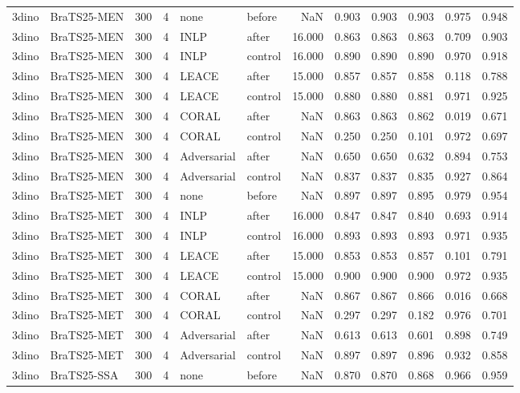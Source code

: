 \begin{tabular}{llrrllrrrrrr}
3dino & BraTS25-MEN & 300 & 4 & none & before & NaN & 0.903 & 0.903 & 0.903 & 0.975 & 0.948 \\
3dino & BraTS25-MEN & 300 & 4 & INLP & after & 16.000 & 0.863 & 0.863 & 0.863 & 0.709 & 0.903 \\
3dino & BraTS25-MEN & 300 & 4 & INLP & control & 16.000 & 0.890 & 0.890 & 0.890 & 0.970 & 0.918 \\
3dino & BraTS25-MEN & 300 & 4 & LEACE & after & 15.000 & 0.857 & 0.857 & 0.858 & 0.118 & 0.788 \\
3dino & BraTS25-MEN & 300 & 4 & LEACE & control & 15.000 & 0.880 & 0.880 & 0.881 & 0.971 & 0.925 \\
3dino & BraTS25-MEN & 300 & 4 & CORAL & after & NaN & 0.863 & 0.863 & 0.862 & 0.019 & 0.671 \\
3dino & BraTS25-MEN & 300 & 4 & CORAL & control & NaN & 0.250 & 0.250 & 0.101 & 0.972 & 0.697 \\
3dino & BraTS25-MEN & 300 & 4 & Adversarial & after & NaN & 0.650 & 0.650 & 0.632 & 0.894 & 0.753 \\
3dino & BraTS25-MEN & 300 & 4 & Adversarial & control & NaN & 0.837 & 0.837 & 0.835 & 0.927 & 0.864 \\
3dino & BraTS25-MET & 300 & 4 & none & before & NaN & 0.897 & 0.897 & 0.895 & 0.979 & 0.954 \\
3dino & BraTS25-MET & 300 & 4 & INLP & after & 16.000 & 0.847 & 0.847 & 0.840 & 0.693 & 0.914 \\
3dino & BraTS25-MET & 300 & 4 & INLP & control & 16.000 & 0.893 & 0.893 & 0.893 & 0.971 & 0.935 \\
3dino & BraTS25-MET & 300 & 4 & LEACE & after & 15.000 & 0.853 & 0.853 & 0.857 & 0.101 & 0.791 \\
3dino & BraTS25-MET & 300 & 4 & LEACE & control & 15.000 & 0.900 & 0.900 & 0.900 & 0.972 & 0.935 \\
3dino & BraTS25-MET & 300 & 4 & CORAL & after & NaN & 0.867 & 0.867 & 0.866 & 0.016 & 0.668 \\
3dino & BraTS25-MET & 300 & 4 & CORAL & control & NaN & 0.297 & 0.297 & 0.182 & 0.976 & 0.701 \\
3dino & BraTS25-MET & 300 & 4 & Adversarial & after & NaN & 0.613 & 0.613 & 0.601 & 0.898 & 0.749 \\
3dino & BraTS25-MET & 300 & 4 & Adversarial & control & NaN & 0.897 & 0.897 & 0.896 & 0.932 & 0.858 \\
3dino & BraTS25-SSA & 300 & 4 & none & before & NaN & 0.870 & 0.870 & 0.868 & 0.966 & 0.959 \\

\end{tabular}
